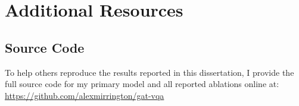 \chapter{Additional Resources}
\label{appendix:resources}

\section{Source Code}
To help others reproduce the results reported in this dissertation, I provide the full source code for my primary model and all reported ablations online at: \url{https://github.com/alexmirrington/gat-vqa}
